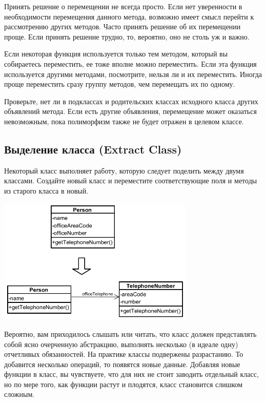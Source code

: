 \documentclass{../../text-style}
\begin{document}
Принять решение о перемещении не всегда просто. Если нет уверенности в необходимости перемещения данного метода, возможно имеет смысл перейти к рассмотрению других методов. Часто принять решение об их перемещении проще. Если принять решение трудно, то, вероятно, оно не столь уж и важно.

Если некоторая функция используется только тем методом, который вы собираетесь переместить, ее тоже вполне можно переместить. Если эта функция используется другими методами, посмотрите, нельзя ли и их переместить. Иногда проще переместить сразу группу методов, чем перемещать их по одному.

Проверьте, нет ли в подклассах и родительских классах исходного класса других объявлений метода. Если есть другие объявления, перемещение может оказаться невозможным, пока полиморфизм также не будет отражен в целевом классе.

\subsection{Выделение класса (Extract Class)}

Некоторый класс выполняет работу, которую следует поделить между двумя классами. Создайте новый класс и переместите соответствующие поля и методы из старого класса в новый.

\begin{center}
    \includegraphics[width=0.7\textwidth]{extractClass.png}
\end{center}

Вероятно, вам приходилось слышать или читать, что класс должен представлять собой ясно очерченную абстракцию, выполнять несколько (в идеале одну) отчетливых обязанностей. На практике классы подвержены разрастанию. То добавится несколько операций, то появятся новые данные. Добавляя новые функции в класс, вы чувствуете, что для них не стоит заводить отдельный класс, но по мере того, как функции растут и плодятся, класс становится слишком сложным.
\end{document}
